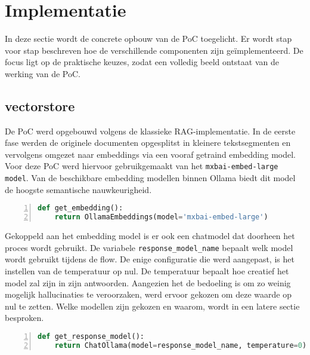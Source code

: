 \section{Implementatie}

In deze sectie wordt de concrete opbouw van de PoC toegelicht. Er wordt stap voor stap beschreven hoe de verschillende componenten zijn geïmplementeerd. De focus ligt op de praktische keuzes, zodat een volledig beeld ontstaat van de werking van de PoC.

\subsection{vectorstore}
De PoC werd opgebouwd volgens de klassieke RAG-implementatie. In de eerste fase werden de originele documenten opgesplitst in kleinere tekstsegmenten en vervolgens omgezet naar embeddings via een vooraf getraind embedding model. Voor deze PoC werd hiervoor gebruikgemaakt van het \verb|mxbai-embed-large model|. Van de beschikbare embedding modellen binnen Ollama biedt dit model de hoogste semantische nauwkeurigheid.

\begin{lstlisting}[basicstyle=\small, frame=single, breaklines=true, postbreak=\mbox{\textcolor{red}{$\hookrightarrow$}\space}, escapeinside ={\%,}, escapechar={!}, numbers=left, language=Python, caption=Ophalen van embedding model]
def get_embedding():
    return OllamaEmbeddings(model='mxbai-embed-large')
\end{lstlisting}

Gekoppeld aan het embedding model is er ook een chatmodel dat doorheen het proces wordt gebruikt. De variabele \verb|response_model_name| bepaalt welk model wordt gebruikt tijdens de flow. De enige configuratie die werd aangepast, is het instellen van de temperatuur op nul. De temperatuur bepaalt hoe creatief het model zal zijn in zijn antwoorden. Aangezien het de bedoeling is om zo weinig mogelijk hallucinaties te veroorzaken, werd ervoor gekozen om deze waarde op nul te zetten. Welke modellen zijn gekozen en waarom, wordt in een latere sectie besproken.

\begin{lstlisting}[basicstyle=\small, frame=single, breaklines=true, postbreak=\mbox{\textcolor{red}{$\hookrightarrow$}\space}, escapeinside ={\%,}, escapechar={!},
numbers=left, language=Python, caption=Initialisatie van het chat model]
def get_response_model():
    return ChatOllama(model=response_model_name, temperature=0)
\end{lstlisting}

